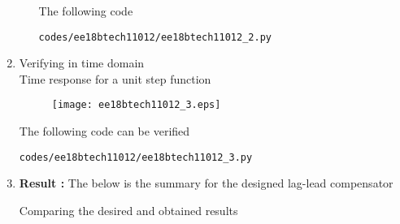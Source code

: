 \begin{enumerate}[label=\thesubsection.\arabic*.,ref=\thesubsection.\theenumi]
\begin{itemize}
The following code 
\begin{lstlisting}
codes/ee18btech11012/ee18btech11012_2.py
\end{lstlisting}
\end{itemize}


\item Verifying in time domain 
\\
\solution 
Time response for a unit step function
\begin{figure}[!h]
\centering
  \texttt{[image: ee18btech11012\_3.eps]}
\caption{}
\label{fig:2} 
\end{figure}


The following code can be verified
\begin{lstlisting}
codes/ee18btech11012/ee18btech11012_3.py
\end{lstlisting}
\item
\textbf{Result :}
The below is the summary for the designed lag-lead compensator
\begin{table}[!ht]
\centering

\caption{Comparing the desired and obtained results}
\label{table:ee18btech11012_table1}
\end{table}

\end{enumerate}
